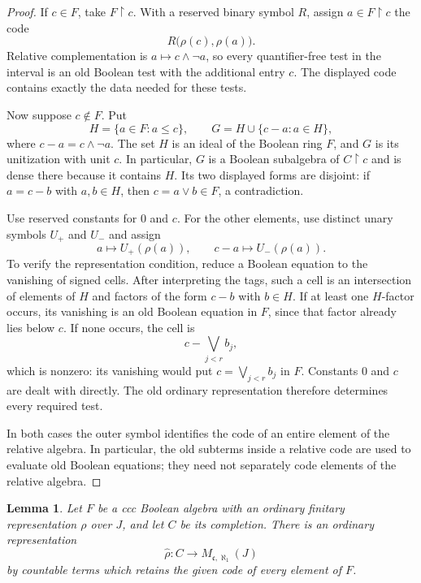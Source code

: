\documentclass[11pt]{article}
\newtheorem{lemma}[theorem]{Lemma}
\theoremstyle{definition}
\theoremstyle{remark}
\newcommand{\restr}{\mathbin{\upharpoonright}}
\newcommand{\cc}{\mathfrak c}
\begin{document}
\begin{proof}
If $c\in F$, take $F\restr c$.  With a reserved binary symbol $R$,
assign $a\in F\restr c$ the code
\[
 R\bigl(\rho(c),\rho(a)\bigr).
\]
Relative complementation is $a\mapsto c\wedge\neg a$, so every
quantifier-free test in the interval is an old Boolean test with the
additional entry $c$.  The displayed code contains exactly the data
needed for these tests.

Now suppose $c\notin F$.  Put
\[
 H=\{a\in F:a\leq c\},\qquad
 G=H\cup\{c-a:a\in H\},
\]
where $c-a=c\wedge\neg a$.  The set $H$ is an ideal of the Boolean
ring $F$, and $G$ is its unitization with unit $c$.  In particular, $G$
is a Boolean subalgebra of $C\restr c$ and is dense there because it
contains $H$.  Its two displayed forms are disjoint: if $a=c-b$ with
$a,b\in H$, then $c=a\vee b\in F$, a contradiction.

Use reserved constants for $0$ and $c$.  For the other elements, use
distinct unary symbols $U_+$ and $U_-$ and assign
\[
 a\longmapsto U_+(\rho(a)),\qquad
 c-a\longmapsto U_-(\rho(a)).
\]
To verify the representation condition, reduce a Boolean equation to the
vanishing of signed cells.  After interpreting the tags, such a cell is
an intersection of elements of $H$ and factors of the form $c-b$ with
$b\in H$.  If at least one $H$-factor occurs, its vanishing is an old
Boolean equation in $F$, since that factor already lies below $c$.
If none occurs, the cell is
\[
 c-\bigvee_{j<r}b_j,
\]
which is nonzero: its vanishing would put $c=\bigvee_{j<r}b_j$ in $F$.
Constants $0$ and $c$ are dealt with directly.  The old ordinary
representation therefore determines every required test.

In both cases the outer symbol identifies the code of an entire element
of the relative algebra.  In particular, the old subterms inside a
relative code are used to evaluate old Boolean equations; they need not
separately code elements of the relative algebra.
\end{proof}

\begin{lemma}\label{lem:completion-representation}
Let $F$ be a ccc Boolean algebra with an ordinary finitary representation
$\rho$ over $J$, and let $C$ be its completion.  There is an ordinary
representation
\[
 \widehat\rho:C\longrightarrow M_{\cc,\aleph_1}(J)
\]
by countable terms which retains the given code of every element of $F$.
\end{lemma}
\end{document}
